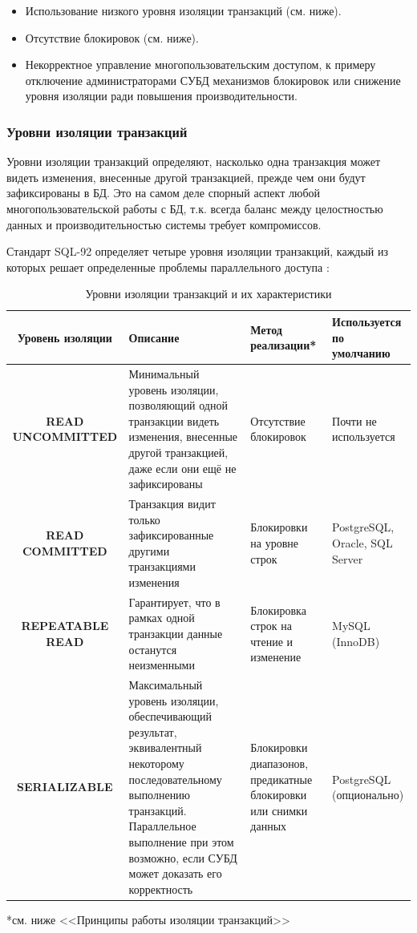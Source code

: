 \begin{itemize}
    \item Использование низкого уровня изоляции транзакций (см. ниже).
    \item Отсутствие блокировок (см. ниже).
    \item Некорректное управление многопользовательским доступом, к примеру отключение администраторами СУБД механизмов блокировок или снижение уровня изоляции ради повышения производительности.
\end{itemize}

\subsubsection{Уровни изоляции транзакций}

Уровни изоляции транзакций определяют, насколько одна транзакция может видеть изменения, внесенные другой транзакцией, прежде чем они будут зафиксированы в БД. Это на самом деле спорный аспект любой многопользовательской работы с БД, т.к. всегда баланс между целостностью данных и производительностью системы требует компромиссов.

Стандарт SQL-92 определяет четыре уровня изоляции транзакций, каждый из которых решает определенные проблемы параллельного доступа \autocite{ElmasriNavathe, Silberschatz}:

\begin{table}[H]
    \centering
    \begin{tabular}{|c|p{4.25cm}|p{3.25cm}|p{3cm}|}
        \hline
        \textbf{Уровень изоляции} & \textbf{Описание} & \textbf{Метод реализации*} & \textbf{Используется по умолчанию} \\
        \hline
        \textbf{READ UNCOMMITTED} & Минимальный уровень изоляции, позволяющий одной транзакции видеть изменения, внесенные другой транзакцией, даже если они ещё не зафиксированы & Отсутствие блокировок & Почти не используется \\
        \hline
        \textbf{READ COMMITTED} & Транзакция видит только зафиксированные другими транзакциями изменения & Блокировки на уровне строк & PostgreSQL, Oracle, SQL Server \\
        \hline
        \textbf{REPEATABLE READ} & Гарантирует, что в рамках одной транзакции данные останутся неизменными & Блокировка строк на чтение и изменение & MySQL (InnoDB) \\
        \hline
        \textbf{SERIALIZABLE} & Максимальный уровень изоляции, обеспечивающий результат, эквивалентный некоторому последовательному выполнению транзакций. Параллельное выполнение при этом возможно, если СУБД может доказать его корректность & Блокировки диапазонов, предикатные блокировки или снимки данных & PostgreSQL (опционально) \\
        \hline
    \end{tabular}
    \caption{Уровни изоляции транзакций и их характеристики}
    \label{tab:isolation_levels}
\end{table}
 *см. ниже <<Принципы работы изоляции транзакций>>

